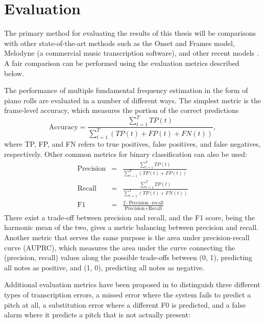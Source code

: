 \section{Evaluation}

The primary method for evaluating the results of this thesis will be comparisons with other state-of-the-art methods such as the Onset and Frames \cite{hawthorne2018piano} model, Melodyne (a commercial music transcription software), and other recent models \cite{kelz2016framewise,ewert2017admm}.
A fair comparison can be performed using the evaluation metrics described below.

The performance of multiple fundamental frequency estimation in the form of piano rolls are evaluated in a number of different ways.
The simplest metric is the frame-level accuracy, which measures the portion of the correct predictions 
\begin{equation}
\mathrm{Accuracy} = \frac{\sum_{t=1}^T TP(t)}{\sum_{t=1}^T \left ( TP(t) + FP(t) + FN(t) \right ) },
\end{equation}
where TP, FP, and FN refers to true positives, false positives, and false negatives, respectively.
Other common metrics for binary classification can also be used:
\begin{eqnarray}
\textrm{Precision} & = & \frac{\sum_{t=1}^T TP(t)}{\sum_{t=1}^T \left ( TP(t) + FP(t) \right ) } \\
\textrm{Recall} & = & \frac{\sum_{t=1}^T TP(t)}{\sum_{t=1}^T \left ( TP(t) + FN(t) \right ) } \\
\textrm{F1} & = & \frac{2 \cdot \textrm{Precision} \cdot \textrm{recall}}{\textrm{Precision} + \textrm{Recall}}
\end{eqnarray}
There exist a trade-off between precision and recall, and the F1 score, being the harmonic mean of the two, gives a metric balancing between precision and recall.
Another metric that serves the same purpose is the area under precision-recall curve (AUPRC), which measures the area under the curve connecting the (precision, recall) values along the possible trade-offs between (0, 1), predicting all notes as positive, and (1, 0), predicting all notes as negative.

Additional evaluation metrics have been proposed in \cite{poliner2007discriminative} to distinguish three different types of transcription errors, a missed error where the system fails to predict a pitch at all, a substitution error where a different F0 is predicted, and a false alarm where it predicts a pitch that is not actually present:

